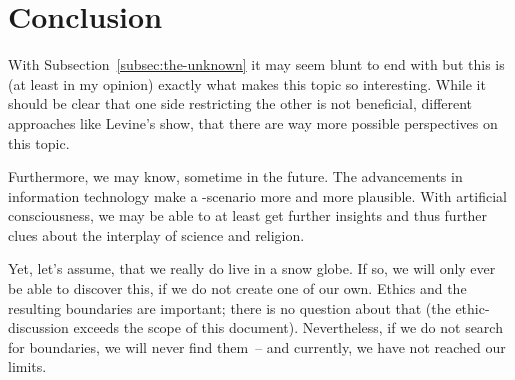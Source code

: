 \section{Conclusion}
\label{sec:Conclusion}

With Subsection~\ref{subsec:the-unknown} it may seem blunt to end with  but this is (at least in my opinion) exactly what makes this topic so interesting.
While it should be clear that one side restricting the other is not beneficial, different approaches like Levine's  show, that there are way more possible perspectives on this topic.

Furthermore, we may know, sometime in the future. The advancements in information technology make a -scenario more and more plausible.
With artificial consciousness, we may be able to at least get further insights and thus further clues about the interplay of science and religion.

Yet, let's assume, that we really do live in a snow globe. If so, we will only ever be able to discover this, if we do not create one of our own. Ethics and the resulting boundaries are important; there is no question about that (the ethic-discussion exceeds the scope of this document).
Nevertheless, if we do not search for boundaries, we will never find them~-- and currently, we have not reached our limits.





